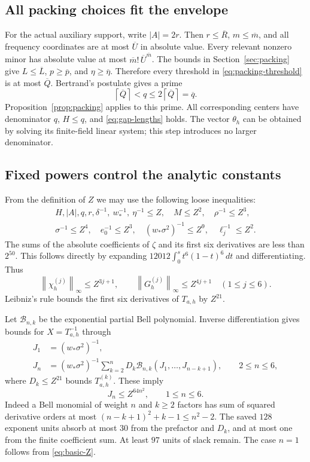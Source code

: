 \documentclass[11pt]{article}
\theoremstyle{remark}
\newcommand{\ceil}[1]{\left\lceil #1\right\rceil}
\newcommand{\norm}[1]{\left\|#1\right\|}
\begin{document}
\subsection{All packing choices fit the envelope}

For the actual auxiliary support, write $|A|=2r$. Then
$r\le\overline R$, $m\le\overline m$, and all frequency coordinates
are at most $\overline U$ in absolute value. Every relevant nonzero minor
has absolute value at most $\overline m!\,\overline U^{\overline m}$.
The bounds in Section~\ref{sec:packing} give
$L\le\overline L$, $p\ge\overline p$, and
$\eta\ge\overline\eta$. Therefore every threshold in
\eqref{eq:packing-threshold} is at most $\overline Q$.
Bertrand's postulate gives a prime
\[
 \ceil{\overline Q}<q\le2\ceil{\overline Q}=\overline q.
\]
Proposition~\ref{prop:packing} applies to this prime. All corresponding
centers have denominator $q$, $H\le q$, and \eqref{eq:gap-lengths} holds.
The vector $\theta_h$ can be obtained by solving its finite-field linear
system; this step introduces no larger denominator.

\subsection{Fixed powers control the analytic constants}

From the definition of $Z$ we may use the following loose inequalities:
\begin{equation}\label{eq:basic-Z}
 \begin{gathered}
 H, |A|, q, r, \delta^{-1},\ w_*^{-1},\ \eta^{-1}\le Z,
 \quad M\le Z^2,\quad\rho^{-1}\le Z^3,\\
 \sigma^{-1}\le Z^4,\quad e_0^{-1}\le Z^3,
 \quad(w_*\sigma^2)^{-1}\le Z^9,
 \quad\ell_j^{-1}\le Z^2.
 \end{gathered}
\end{equation}
The sums of the absolute coefficients of $\zeta$ and its first six
derivatives are less than $2^{50}$. This follows directly by expanding
$12012\int_0^s t^6(1-t)^6\,dt$ and differentiating. Thus
\[
 \norm{\chi_h^{(j)}}_\infty\le Z^{3j+1},\qquad
 \norm{G_h^{(j)}}_\infty\le Z^{4j+1}\quad(1\le j\le6).
\]
Leibniz's rule bounds the first six derivatives of $T_{a,h}$ by $Z^{21}$.

Let $\mathcal B_{n,k}$ be the exponential partial Bell polynomial.
Inverse differentiation gives bounds for $X=T_{a,h}^{-1}$ through
\begin{align*}
 J_1&=(w_*\sigma^2)^{-1},\\
 J_n&=(w_*\sigma^2)^{-1}
       \sum_{k=2}^n D_k\mathcal B_{n,k}(J_1,\ldots,J_{n-k+1}),
       \qquad 2\le n\le6,
\end{align*}
where $D_k\le Z^{21}$ bounds $T_{a,h}^{(k)}$.
These imply
\begin{equation}\label{eq:inverse-Z}
 J_n\le Z^{64n^2},\qquad1\le n\le6.
\end{equation}
Indeed a Bell monomial of weight $n$ and $k\ge2$ factors has sum of
squared derivative orders at most $(n-k+1)^2+k-1\le n^2-2$.
The saved $128$ exponent units absorb at most $30$ from the prefactor
and $D_k$, and at most one from the finite coefficient sum. At least
$97$ units of slack remain. The case $n=1$ follows from
\eqref{eq:basic-Z}.
\end{document}
